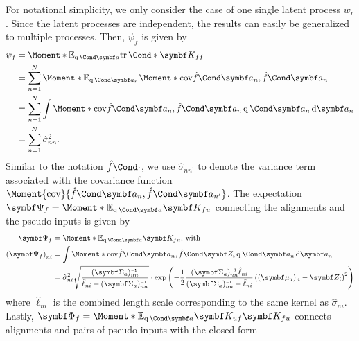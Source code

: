 For notational simplicity, we only consider the case of one single latent process $w_r$.
Since the latent processes are independent, the results can easily be generalized to multiple processes.
Then, $\psi_f$ is given by
\begin{align}
    \begin{split}
        \psi_f &= \Moment*{\E_{\Variat{\rv{a}}}}{\Fun*{\tr}{\mat{K_{ff}}}} \\
        &= \sum_{n=1}^N \Moment*{\E_{\Variat{\rv{a}_n}}}{\Moment*{\cov}{\Fun{\hat{f}}{\mat{a}_n}, \Fun{\hat{f}}{\mat{a}_n}}} \\
        &= \sum_{n=1}^N \int \Moment*{\cov}{\Fun{\hat{f}}{\mat{a}_n}, \Fun{\hat{f}}{\mat{a}_n}} \Variat{\rv{a}_n} \diff \rv{a}_n \\
        &= \sum_{n=1}^N \hat{\sigma}_{nn}^2.
    \end{split}
\end{align}
Similar to the notation $\Fun{\hat{f}}{\cdot}$, we use $\hat{\sigma}_{nn^\prime}$ to denote the variance term associated with the covariance function $\Moment{\cov}{\Fun{\hat{f}}{\mat{a}_n}, \Fun{\hat{f}}{\mat{a}_{n^\prime}}}$.
The expectation $\mat{\Psi_f} = \Moment*{\E_{\Variat{\rv{a}}}}{\mat{K_{fu}}}$ connecting the alignments and the pseudo inputs is given by
\begin{align}
    \begin{split}
        \mat{\Psi_f} &= \Moment*{\E_{\Variat{\rv{a}}}}{\mat{K_{fu}}}\text{, with} \\
        \left( \mat{\Psi_f} \right)_{ni}
        &= \int \Moment*{\cov}{\Fun{\hat{f}}{\mat{a}_n}, \Fun{\hat{f}}{\mat{Z}_i}} \Variat{\rv{a}_n} \diff \rv{a}_n \\
        &= \hat{\sigma}_{ni}^2 \sqrt{\frac{(\mat{\Sigma}_a)_{nn}\inv}{\hat{\ell}_{ni} + (\mat{\Sigma}_a)_{nn}\inv}}
        \cdot \exp\left(-\frac{1}{2} \frac{(\mat{\Sigma}_a)_{nn}\inv\hat{\ell}_{ni}}{(\mat{\Sigma}_a)_{nn}\inv + \hat{\ell}_{ni}} \left((\mat{\mu}_a)_n - \mat{Z}_i\right)^2\right)
    \end{split}
\end{align}
where $\hat{\ell}_{ni}$ is the combined length scale corresponding to the same kernel as $\hat{\sigma}_{ni}$.
Lastly, $\mat{\Phi_f} = \Moment*{\E_{\Variat{\rv{a}}}}{\mat{K_{uf}}\mat{K_{fu}}}$ connects alignments and pairs of pseudo inputs with the closed form

